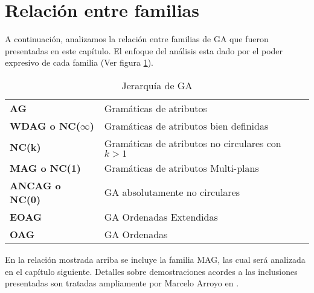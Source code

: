 \section{Relación entre familias}

A continuación, analizamos la relación entre familias de GA que fueron presentadas en este capítulo. El enfoque del análisis esta dado por el poder expresivo de cada familia (Ver figura \ref{jer-GA}).

\begin{table}[!h]\centering
\begin{tabular}{ll}
\textbf{AG}         & Gramáticas de atributos \\
\textbf{WDAG o NC($\infty$)}       & Gramáticas de atributos bien definidas\\
\textbf{NC(k)}       & Gramáticas de atributos no circulares con $k > 1$\\
\textbf{MAG o NC(1)}       & Gramáticas de atributos Multi-plans\\
\textbf{ANCAG o NC(0)}      & GA absolutamente no circulares \\
\textbf{EOAG}       & GA Ordenadas Extendidas \\
\textbf{OAG}        & GA Ordenadas \\
\end{tabular}
\caption{Jerarquía de GA}
\label{jer-GA}
\end{table}

En la relación mostrada arriba se incluye la familia MAG, las cual será analizada en el capítulo siguiente.
Detalles sobre demostraciones acordes a las inclusiones presentadas son tratadas ampliamente por Marcelo Arroyo en \cite{tesismarcelo}.